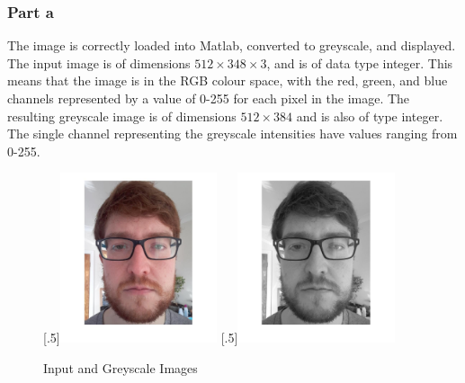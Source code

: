 \documentclass[a4paper]{article}
\begin{document}
	\subsubsection{Part a}
	The image is correctly loaded into Matlab, converted to greyscale, and
	displayed. The input image is of dimensions $512\times 348\times 3$, and
	is of data type integer. This means that the image is in the RGB colour
	space, with the red, green, and blue channels represented by a value of
	0-255 for each pixel in the image. The resulting greyscale image is of
	dimensions  $512\times 384$ and is also of type integer. The single
	channel representing the greyscale intensities have values ranging from
	0-255.
	\begin{figure}[H]
		\centering
		[.5\linewidth]{\includegraphics[height=5cm]{Results/Q1/a/qaInput.jpg}}%
		[.5\linewidth]{\includegraphics[height=5cm]{Results/Q1/a/qaGreyscale.jpg}}%
		\caption{Input and Greyscale Images}
		\label{fig:}
	\end{figure}
\end{document}
